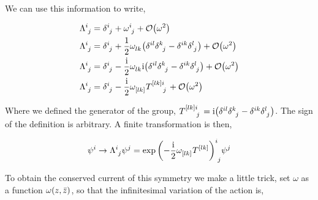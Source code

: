 We can use this information to write,

\begin{align*}
    \tensor{\Lambda}{^i_j}&=\tensor{\delta}{^i_j}+\tensor{\omega}{^i_j}+\mathcal O\qty(\omega^2)\\
    \tensor{\Lambda}{^i_j}&=\tensor{\delta}{^i_j}+\frac12\tensor{\omega}{_l_k}\qty(\tensor{\delta}{^i^l}\tensor{\delta}{^k_j}-\tensor{\delta}{^i^k}\tensor{\delta}{^l_j})+\mathcal O\qty(\omega^2)\\
    \tensor{\Lambda}{^i_j}&=\tensor{\delta}{^i_j}-\frac\im2\tensor{\omega}{_l_k}\im\qty(\tensor{\delta}{^i^l}\tensor{\delta}{^k_j}-\tensor{\delta}{^i^k}\tensor{\delta}{^l_j})+\mathcal O\qty(\omega^2)\\
    \tensor{\Lambda}{^i_j}&=\tensor{\delta}{^i_j}-\frac\im2\tensor{\omega}{_{\qty[lk]}}\tensor{T}{^{\qty[lk]}^i_j}+\mathcal O\qty(\omega^2)
\end{align*}

Where we defined the generator of the group, $\tensor{T}{^{\qty[lk]}^i_j}=\im\qty(\tensor{\delta}{^i^l}\tensor{\delta}{^k_j}-\tensor{\delta}{^i^k}\tensor{\delta}{^l_j})$. The sign of the 
definition is arbitrary. A finite transformation is then,

\begin{align*}
    \psi ^i\rightarrow\tensor{\Lambda}{^i_j}\psi^j=\tensor{\exp\qty(-\frac\im2\tensor{\omega}{_{\qty[lk]}}\tensor{T}{^{\qty[lk]}})}{^i_j}\psi^j
\end{align*}

To obtain the conserved current of this symmetry we make a little trick, set $\omega$ as a function $\omega\qty(z,\bar z)$, so that the infinitesimal variation of the action is,

